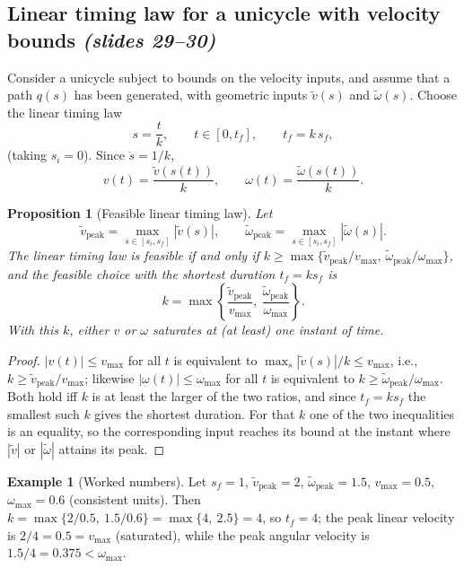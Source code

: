 \documentclass[11pt,a4paper]{article}
\def\boldsymbol#1{#1}%
\newcommand{\q}{\boldsymbol{q}}
\newcommand{\vt}{\tilde v}
\newcommand{\wt}{\tilde\omega}
\theoremstyle{definition}
\newtheorem{example}[definition]{Example}
\theoremstyle{plain}
\newtheorem{proposition}[definition]{Proposition}
\theoremstyle{remark}
\begin{document}
\subsection{Linear timing law for a unicycle with velocity bounds \emph{(slides 29--30)}}
 
Consider a unicycle subject to bounds on the velocity inputs, and assume that a path $\q(s)$ has been generated, with geometric
inputs $\vt(s)$ and $\wt(s)$. Choose the linear timing law
\begin{equation}
s=\frac{t}{k},\qquad t\in[0,t_f],\qquad t_f=k\,s_f ,
\end{equation}
(taking $s_i=0$). Since $\dot s=1/k$,
\begin{equation}
v(t)=\frac{\vt(s(t))}{k},\qquad \omega(t)=\frac{\wt(s(t))}{k}.
\end{equation}
 
\begin{proposition}[Feasible linear timing law]\label{prop:timing}
Let
\[
\vt_{\mathrm{peak}}=\max_{s\in[s_i,s_f]}|\vt(s)|,\qquad \wt_{\mathrm{peak}}=\max_{s\in[s_i,s_f]}|\wt(s)| .
\]
The linear timing law is feasible if and only if $k\ge \max\{\vt_{\mathrm{peak}}/v_{\max},\,\wt_{\mathrm{peak}}/\omega_{\max}\}$, and
the feasible choice with the shortest duration $t_f=ks_f$ is
\begin{equation}
k=\max\left\{\frac{\vt_{\mathrm{peak}}}{v_{\max}},\ \frac{\wt_{\mathrm{peak}}}{\omega_{\max}}\right\}.
\end{equation}
With this $k$, either $v$ or $\omega$ saturates at (at least) one instant of time.
\end{proposition}
\begin{proof}
$|v(t)|\le v_{\max}$ for all $t$ is equivalent to $\max_s|\vt(s)|/k\le v_{\max}$, i.e., $k\ge\vt_{\mathrm{peak}}/v_{\max}$; likewise
$|\omega(t)|\le\omega_{\max}$ for all $t$ is equivalent to $k\ge\wt_{\mathrm{peak}}/\omega_{\max}$. Both hold iff $k$ is at least the larger
of the two ratios, and since $t_f=ks_f$ the smallest such $k$ gives the shortest duration. For that $k$ one of the two inequalities
is an equality, so the corresponding input reaches its bound at the instant where $|\vt|$ or $|\wt|$ attains its peak. \qedhere
\end{proof}
 
\begin{example}[Worked numbers]
Let $s_f=1$, $\vt_{\mathrm{peak}}=2$, $\wt_{\mathrm{peak}}=1.5$, $v_{\max}=0.5$, $\omega_{\max}=0.6$ (consistent units). Then
$k=\max\{2/0.5,\ 1.5/0.6\}=\max\{4,\ 2.5\}=4$, so $t_f=4$; the peak linear velocity is $2/4=0.5=v_{\max}$ (saturated), while the
peak angular velocity is $1.5/4=0.375<\omega_{\max}$.
\end{example}
 
\end{document}
